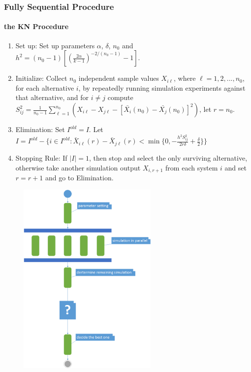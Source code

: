 \documentclass{beamer}
\begin{document}
\begin{frame}
\frametitle{Fully Sequential Procedure}
\framesubtitle{the KN Procedure}
\begin{enumerate}
\item{Set up: } Set up parameters $\alpha$, $\delta$, $n_0$ and $h^2 = (n_0 -1)[(\frac{2\alpha}{k - 1})^{-2/(n_0-1)} - 1]$.
\item{Initialize: } Collect $n_0$ independent sample values $X_{i\ell}$, where $\ell = 1, 2,...,n_0$, for each alternative $i$, by repeatedly running simulation experiments against that alternative, and for $i \neq j$ compute $S_{ij}^2 = \frac{1}{n_0 - 1}\sum_{\ell=1}^{n_0}(X_{i\ell} - X_{j\ell} - [\bar{X_i}(n_0) - \bar{X_j}(n_0)]^2)$, let $r = n_0$.
\item{Elimination: } Set $I^{old} = I$. Let $I = I^{old} - \{i \in I^{old}: \bar{X}_{i\ell}(r) - \bar{X}_{j\ell}(r) < \min\{0, - \frac{h^2S_{ij}^2}{2r\delta} + \frac{\delta}{2} \} \}$
\item{Stopping Rule: } If $|I| = 1$, then stop and select the only surviving alternative, otherwise take another simulation output $X_{i,r+1}$ from each system $i$ and set $r = r + 1$ and go to Elimination.
\end{enumerate}
\end{frame}

\begin{frame}
\begin{figure}[ht]
\centering
\includegraphics[height=96mm]{kn_activity.png}
\end{figure}
\end{frame}
\end{document}
